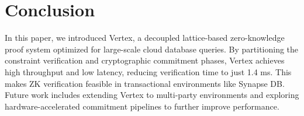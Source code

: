 \section{Conclusion}
\label{sec:conclusion}

In this paper, we introduced Vertex, a decoupled lattice-based zero-knowledge proof system optimized for large-scale cloud database queries. By partitioning the constraint verification and cryptographic commitment phases, Vertex achieves high throughput and low latency, reducing verification time to just 1.4 ms. This makes ZK verification feasible in transactional environments like Synapse DB. Future work includes extending Vertex to multi-party environments and exploring hardware-accelerated commitment pipelines to further improve performance.
